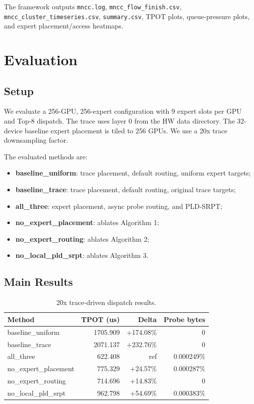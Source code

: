 \documentclass[10pt,conference]{IEEEtran}
\begin{document}
The framework outputs \texttt{mncc.log}, \texttt{mncc\_flow\_finish.csv}, \texttt{mncc\_cluster\_timeseries.csv}, \texttt{summary.csv}, TPOT plots, queue-pressure plots, and expert placement/access heatmaps.

\section{Evaluation}

\subsection{Setup}

We evaluate a 256-GPU, 256-expert configuration with 9 expert slots per GPU and Top-8 dispatch. The trace uses layer 0 from the HW data directory. The 32-device baseline expert placement is tiled to 256 GPUs. We use a 20x trace downsampling factor.

The evaluated methods are:
\begin{itemize}
  \item \textbf{baseline\_uniform}: trace placement, default routing, uniform expert targets;
  \item \textbf{baseline\_trace}: trace placement, default routing, original trace targets;
  \item \textbf{all\_three}: expert placement, async probe routing, and PLD-SRPT;
  \item \textbf{no\_expert\_placement}: ablates Algorithm 1;
  \item \textbf{no\_expert\_routing}: ablates Algorithm 2;
  \item \textbf{no\_local\_pld\_srpt}: ablates Algorithm 3.
\end{itemize}

\subsection{Main Results}

\begin{table}[t]
\centering
\caption{20x trace-driven dispatch results.}
\label{tab:results}
\small
\begin{tabular}{lrrr}
\toprule
\textbf{Method} & \textbf{TPOT (us)} & \textbf{Delta} & \textbf{Probe bytes}\\
\midrule
baseline\_uniform & 1705.909 & +174.08\% & 0\\
baseline\_trace & 2071.137 & +232.76\% & 0\\
all\_three & 622.408 & ref & 0.000249\%\\
no\_expert\_placement & 775.329 & +24.57\% & 0.000287\%\\
no\_expert\_routing & 714.696 & +14.83\% & 0\\
no\_local\_pld\_srpt & 962.798 & +54.69\% & 0.000383\%\\
\bottomrule
\end{tabular}
\end{table}
\end{document}
